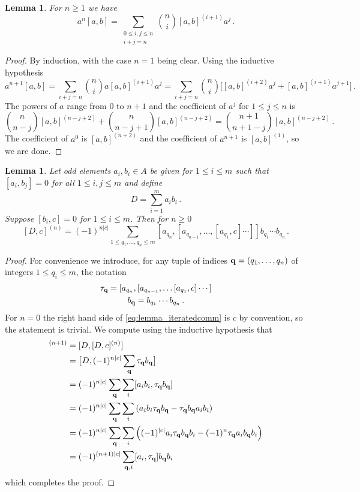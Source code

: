 \documentclass[english,letter paper,12pt,leqno]{article}
\newtheorem{lemma}[theorem]{Lemma}
\theoremstyle{example}
\numberwithin{equation}{section}
\def\be{\begin{equation}}
\def\ee{\end{equation}}
\begin{document}
\begin{lemma}\label{lemma:woop4} For $n \ge 1$ we have
\be
a^n [a, b] = \sum_{\substack{0 \le i,j \le n \\ i+j=n}} \binom{n}{i} [a,b]^{(i+1)} a^j\,.
\ee
\end{lemma}
\begin{proof}
By induction, with the case $n = 1$ being clear. Using the inductive hypothesis
\[
a^{n+1} [a, b] = \sum_{i+j=n} \binom{n}{i} a [a,b]^{(i+1)} a^j = \sum_{i+j=n} \binom{n}{i} \Big[ [a,b]^{(i+2)} a^j + [a,b]^{(i+1)} a^{j+1} \Big]\,.
\]
The powers of $a$ range from $0$ to $n+1$ and the coefficient of $a^j$ for $1 \le j \le n$ is
\[
\binom{n}{n-j} [a,b]^{(n-j+2)} + \binom{n}{n-j+1} [a,b]^{(n-j+2)} = \binom{n+1}{n+1-j} [a,b]^{(n-j+2)}\,.
\]
The coefficient of $a^0$ is $[a,b]^{(n+2)}$ and the coefficient of $a^{n+1}$ is $[a,b]^{(1)}$, so we are done.
\end{proof}

\begin{lemma}\label{lemma_iteratedcomm} Let odd elements $a_i, b_i \in A$ be given for $1 \le i \le m$ such that $[a_i, b_j] = 0$ for all $1 \le i,j \le m$ and define
\[
D = \sum_{i=1}^m a_i b_i\,.
\]
Suppose $[b_i,c] = 0$ for $1 \le i \le m$. Then for $n \ge 0$
\be\label{eq:lemma_iteratedcomm}
[D, c]^{(n)} = (-1)^{n|c|} \sum_{1 \le q_1,\ldots,q_n \le m} [a_{q_n}, [a_{q_{n-1}}, \ldots, [ a_{q_1}, c] \cdots ]] b_{q_1} \cdots b_{q_n}\,.
\ee
\end{lemma}
\begin{proof}
For convenience we introduce, for any tuple of indices $\bold{q} = (q_1,\ldots,q_n)$ of integers $1 \le q_i \le m$, the notation
\begin{gather}
\tau_{\bold{q}} = [ a_{q_n}, [ a_{q_{n-1}}, \ldots [ a_{q_1}, c ] \cdots ] \label{defn:tau}\\
b_{\bold{q}} = b_{q_1} \cdots b_{q_n} \label{defn:bq}\,.
\end{gather}
For $n = 0$ the right hand side of \eqref{eq:lemma_iteratedcomm} is $c$ by convention, so the statement is trivial. We compute using the inductive hypothesis that
\begin{align*}
[D, c]^{(n+1)} &= [ D, [D, c]^{(n)} ]\\
&= \big[D, (-1)^{n|c|} \sum_{\bold{q}} \tau_{\bold{q}} b_{\bold{q}}\big]\\
&= (-1)^{n|c|} \sum_{\bold{q}} \sum_i [ a_i b_i , \tau_{\bold{q}} b_{\bold{q}}]\\
&= (-1)^{n|c|} \sum_{\bold{q}} \sum_i \left( a_i b_i \tau_{\bold{q}} b_{\bold{q}} - \tau_{\bold{q}} b_{\bold{q}} a_i b_i \right)\\
&= (-1)^{n|c|} \sum_{\bold{q}} \sum_i \left( (-1)^{|c|} a_i \tau_{\bold{q}} b_{\bold{q}} b_i - (-1)^n \tau_{\bold{q}} a_i b_{\bold{q}} b_i \right)\\
&= (-1)^{(n+1)|c|} \sum_{\bold{q}, i} [ a_i, \tau_{\bold{q}} ] b_{\bold{q}} b_i
\end{align*}
which completes the proof.
\end{proof}
\end{document}

